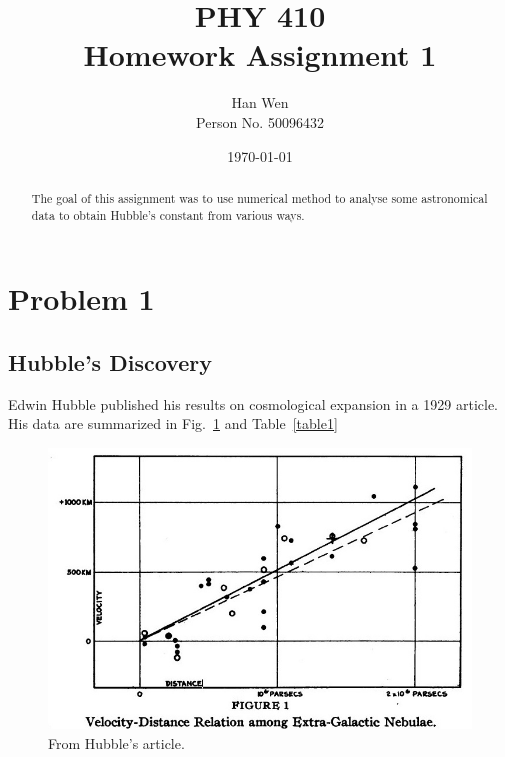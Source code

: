 \documentclass[11pt,letterpaper]{article}
\begin{document}
\title{PHY 410 \\ Homework Assignment 1}
\author{Han Wen \\ \tiny Person No. 50096432}
\date{\today}

\maketitle

\begin{abstract}
The goal of this assignment was to use numerical method to analyse some astronomical data to obtain Hubble's constant from various ways.
\end{abstract}

\tableofcontents

\newpage
\section{Problem 1}

\subsection{Hubble's Discovery}

Edwin Hubble published his results on cosmological expansion in
a 1929 article\cite{hubble1929}.
His data are summarized in Fig.~\ref{figure1} and Table~\ref{table1}

\begin{figure}
\begin{center}
\includegraphics[width=0.9\linewidth]{hubble-fig1.png}
\caption{From Hubble's article\cite{hubble1929}.}
\label{figure1}
\end{center}
\end{figure}
\end{document}

